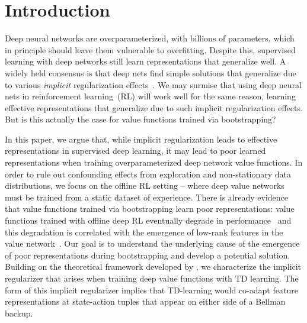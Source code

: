 \vspace{-0.1cm}
\section{Introduction}
\vspace{-0.1cm}
Deep neural networks are overparameterized, with billions of parameters, which in principle should leave them vulnerable to overfitting. Despite this, supervised learning with deep networks still learn representations that generalize  well. A widely held consensus is that deep nets find simple solutions that generalize due to various \emph{implicit} regularization effects~\citep{blanc2020implicit,woodworth2020kernel,arora2018optimization,gunasekar2017implicit,wei2019regularization,li2019towards}. We may surmise that using deep neural nets in reinforcement learning~(RL) will work well for the same reason, learning effective representations that generalize due to such implicit regularization effects. But is this actually the case for value functions trained via bootstrapping? 

In this paper, we argue that, while implicit regularization leads to effective representations in supervised deep learning, it may lead to poor learned representations when training overparameterized deep network value functions. 
In order to rule out confounding effects from exploration and non-stationary data distributions, we focus on the offline RL setting -- where deep value networks must be trained from a static dataset of experience.
There is already evidence that value functions trained via bootstrapping learn poor representations: value functions trained with offline deep RL eventually degrade in performance~\citep{agarwal2019optimistic, kumar2021implicit} and this degradation is correlated with the emergence of low-rank features
in the value network~\citep{kumar2021implicit}.
Our goal is to understand the underlying cause of the emergence of poor representations during bootstrapping and develop a potential solution. Building on the theoretical framework developed by \citet{blanc2020implicit,damian2021label}, we characterize the implicit regularizer that arises when training deep value functions with TD learning. The form of this implicit regularizer implies that TD-learning would co-adapt feature representations at state-action tuples that appear on either side of a Bellman backup.

